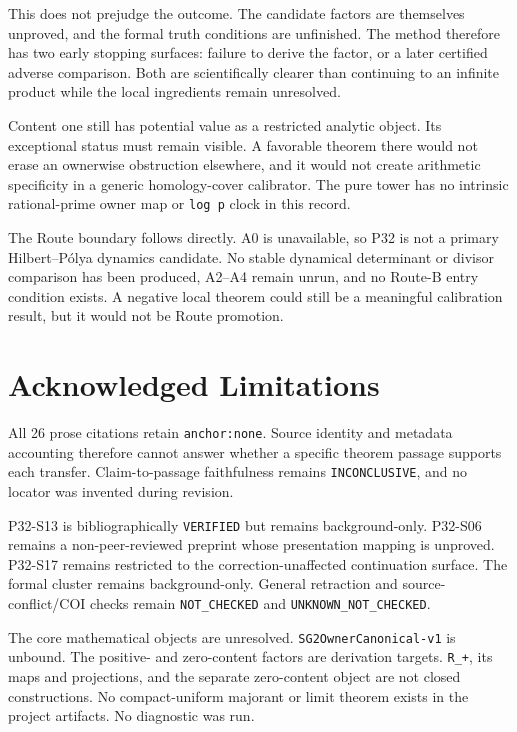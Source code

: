 \documentclass[11pt]{article}
\begin{document}
This does not prejudge the outcome. The candidate factors are themselves
unproved, and the formal truth conditions are unfinished. The method
therefore has two early stopping surfaces: failure to derive the factor,
or a later certified adverse comparison. Both are scientifically clearer
than continuing to an infinite product while the local ingredients
remain unresolved.

Content one still has potential value as a restricted analytic object.
Its exceptional status must remain visible. A favorable theorem there
would not erase an ownerwise obstruction elsewhere, and it would not
create arithmetic specificity in a generic homology-cover calibrator.
The pure tower has no intrinsic rational-prime owner map or
\texttt{log\ p} clock in this record.

The Route boundary follows directly. A0 is unavailable, so P32 is not a
primary Hilbert--Pólya dynamics candidate. No stable dynamical
determinant or divisor comparison has been produced, A2--A4 remain
unrun, and no Route-B entry condition exists. A negative local theorem
could still be a meaningful calibration result, but it would not be
Route promotion.

\hypertarget{8-acknowledged-limitations}{%
\section{Acknowledged
Limitations}\label{8-acknowledged-limitations}}

All 26 prose citations retain \texttt{anchor:none}. Source identity and
metadata accounting therefore cannot answer whether a specific theorem
passage supports each transfer. Claim-to-passage faithfulness remains
\texttt{INCONCLUSIVE}, and no locator was invented during revision.

P32-S13 is bibliographically \texttt{VERIFIED} but remains background-only. P32-S06 remains
a non-peer-reviewed preprint whose presentation mapping is unproved.
P32-S17 remains restricted to the correction-unaffected continuation
surface. The formal cluster remains background-only. General retraction
and source-conflict/COI checks remain \texttt{NOT\_CHECKED} and
\texttt{UNKNOWN\_NOT\_CHECKED}.

The core mathematical objects are unresolved.
\texttt{SG2OwnerCanonical-v1} is unbound. The positive- and zero-content
factors are derivation targets. \texttt{R\_+}, its maps and projections,
and the separate zero-content object are not closed constructions. No
compact-uniform majorant or limit theorem exists in the project
artifacts. No diagnostic was run.
\end{document}
